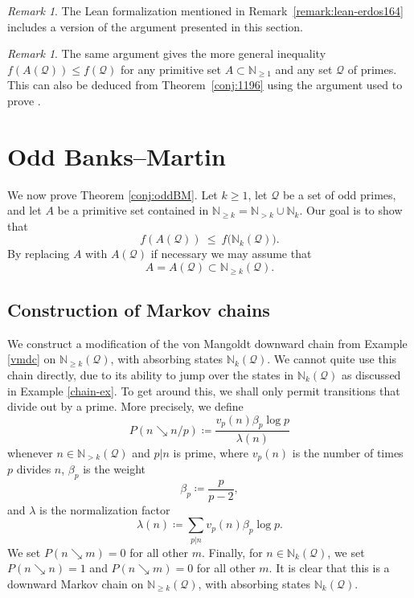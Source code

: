 \documentclass[12pt]{amsart}
\theoremstyle{definition}
\theoremstyle{remark}
\newtheorem{remark}[theorem]{Remark}
\numberwithin{equation}{section}
\newcommand{\N}{{\mathbb N}}
\newcommand{\1}{{\mathbf 1}}
\begin{document}
\begin{remark}
The Lean formalization mentioned in Remark~\ref{remark:lean-erdos164} includes a version of the argument presented in this section.
\end{remark}

\begin{remark}\label{1196-gen} The same argument gives the more general inequality $f(A({\mathcal Q})) \leq f({\mathcal Q})$ for any primitive set $A \subset \N_{\geq 1}$ and any set ${\mathcal Q}$ of primes. This can also be deduced from Theorem~\ref{conj:1196} using the argument used to prove \cite[Theorem 2]{ezhang}.
\end{remark}

\section{Odd Banks--Martin}\label{obm-sec}

We now prove Theorem \ref{conj:oddBM}.  Let $k \geq 1$, let $\mathcal Q$ be a set of odd primes, and let $A$ be a primitive set contained in $\N_{\geq k} = \N_{>k} \cup \N_k$.
Our goal is to show that
$$ f(A(\mathcal Q)) \ \le\ f\big(\N_k(\mathcal Q)\big).$$
By replacing $A$ with $A(\mathcal Q)$ if necessary we may assume that
$$ A = A(\mathcal Q) \subset \N_{\ge k}({\mathcal Q}).$$

\subsection{Construction of Markov chains}

We construct a modification of the von Mangoldt downward chain from Example \ref{vmdc} on $\N_{\ge k}({\mathcal Q})$, with absorbing states $\N_k({\mathcal Q})$.  We cannot quite use this chain directly, due to its ability to jump over the states in $\N_k({\mathcal Q})$ as discussed in Example \ref{chain-ex}.  To get around this, we shall only permit transitions that divide out by a prime.  More precisely, we define
\begin{equation}\label{pdown}
P(n \searrow n/p) \coloneq \frac{v_p(n) \beta_p \log p}{\lambda(n)}
\end{equation}
whenever $n\in \N_{>k}({\mathcal Q})$ and $p|n$ is prime, where $v_p(n)$ is the number of times $p$ divides $n$, $\beta_p$ is the weight
$$ \beta_p \coloneq \frac{p}{p-2},$$
and $\lambda$ is the normalization factor
$$ \lambda(n) \coloneq \sum_{p|n} v_p(n) \beta_p \log p.$$
We set $P(n \searrow m)=0$ for all other $m$.  Finally, for $n \in \N_k({\mathcal Q})$, we set $P(n \searrow n)=1$ and $P(n \searrow m)=0$ for all other $m$.  It is clear that this is a downward Markov chain on $\N_{\ge k}({\mathcal Q})$, with absorbing states $\N_k({\mathcal Q})$.
\end{document}
